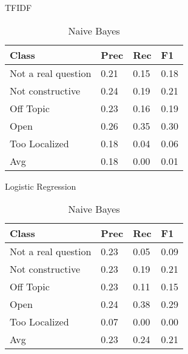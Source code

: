 TFIDF
\begin{table}[!htpb]
\centering
\begin{minipage}{.5\linewidth}
    \begin{tabular}{|l|l|l|l|} \hline
    \textbf{Class}& \textbf{Prec} & \textbf{Rec} & \textbf{F1} \\ \hline
    Not a real question & 0.21      & 0.15   & 0.18     \\
    Not constructive    & 0.24      & 0.19   & 0.21     \\
    Off Topic           & 0.23      & 0.16   & 0.19     \\
    Open                & 0.26      & 0.35   & 0.30     \\
    Too Localized       & 0.18      & 0.04   & 0.06     \\ \hline
    Avg                 & 0.18      & 0.00   & 0.01   \\ \hline  
    \end{tabular}
    \caption{Logistic Regression}
    \label{tab3:lr}
\end{minipage}%
\begin{minipage}{.5\linewidth}
    \begin{tabular}{|l|l|l|l|} \hline
    \textbf{Class}& \textbf{Prec} & \textbf{Rec} & \textbf{F1} \\ \hline
    Not a real question & 0.23      & 0.05   & 0.09     \\
    Not constructive    & 0.23      & 0.19   & 0.21     \\
    Off Topic           & 0.23      & 0.11   & 0.15     \\
    Open                & 0.24      & 0.38   & 0.29     \\
    Too Localized       & 0.07      & 0.00   & 0.00     \\ \hline
    Avg                 & 0.23      & 0.24   & 0.21   \\ \hline  
    \end{tabular}
    \caption{Naive Bayes}
    \label{tab3:nb}
\end{minipage}
\end{table}


